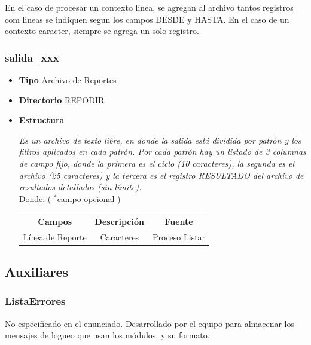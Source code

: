 \documentclass[a4paper,10pt,titlepage]{article}
\begin{document}
En el caso de procesar un contexto linea, se agregan al archivo tantos registros com lineas se indiquen segun los campos DESDE y HASTA. En el caso de un contexto caracter, siempre se agrega un solo registro.

		\subsubsection{salida\_xxx}

			\begin {itemize}
				\item \textbf{Tipo} {Archivo de Reportes}
				\item \textbf{Directorio} {REPODIR}
				\item \textbf{Estructura} {\textit{Es un archivo de texto libre, en donde la salida está dividida por patrón y los filtros aplicados en cada patrón. Por cada patrón hay un listado de 3 columnas de campo fijo, donde la primera es el ciclo (10 caracteres), la segunda es el archivo (25 caracteres) y la tercera es el registro RESULTADO del archivo de resultados detallados (sin límite).}\\
					Donde: (	$^*$campo  opcional )\ 
					\begin{table}[H]
					\centering
					\begin{tabular}{| c | c | c |}
						\hline
						Campos 	& Descripción & Fuente	\\
						\hline
							Línea de Reporte  & Caracteres & Proceso Listar\\
						\hline 
						
					\end{tabular}
					\end{table}
				}
			\end{itemize}
	

	\subsection{Auxiliares}
	
		\subsubsection{ListaErrores}
	
No especificado en el enunciado. Desarrollado por el equipo para almacenar los mensajes de logueo que usan los módulos, y su formato.
\end{document}
